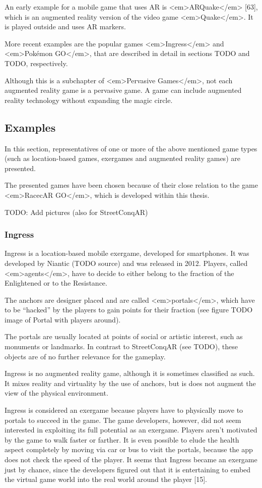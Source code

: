 An early example for a mobile game that uses AR is <em>ARQuake</em> [63], which is an augmented reality version of the video game <em>Quake</em>. It is played outside and uses AR markers.

More recent examples are the popular games <em>Ingress</em> and <em>Pokémon GO</em>, that are described in detail in sections TODO and TODO, respectively.

Although this is a subchapter of <em>Pervasive Games</em>, not each augmented reality game is a pervasive game. A game can include augmented reality technology without expanding the magic circle.

\subsection{Examples}\label{sec:examples}
In this section, representatives of one or more of the above mentioned game types (such as location-based games, exergames and augmented reality games) are presented.

The presented games have been chosen because of their close relation to the game <em>RacecAR GO</em>, which is developed within this thesis.

TODO: Add pictures (also for StreetConqAR)

\subsubsection{Ingress}
Ingress is a location-based mobile exergame, developed for smartphones. It was developed by Niantic (TODO source) and was released in 2012. Players, called <em>agents</em>, have to decide to either belong to the fraction of the Enlightened or to the Resistance.

The anchors are designer placed and are called <em>portals</em>, which have to be “hacked” by the players to gain points for their fraction (see figure TODO image of Portal with players around).

The portals are usually located at points of social or artistic interest, such as monuments or landmarks. In contrast to StreetConqAR (see TODO), these objects are of no further relevance for the gameplay.

Ingress is no augmented reality game, although it is sometimes classified as such. It mixes reality and virtuality by the use of anchors, but is does not augment the view of the physical environment.

Ingress is considered an exergame because players have to physically move to portals to succeed in the game. The game developers, however, did not seem interested in exploiting its full potential as an exergame. Players aren’t motivated by the game to walk faster or farther. It is even possible to elude the health aspect completely by moving via car or bus to visit the portals, because the app does not check the speed of the player. It seems that Ingress became an exergame just by chance, since the developers figured out that it is entertaining to embed the virtual game world into the real world around the player [15].

